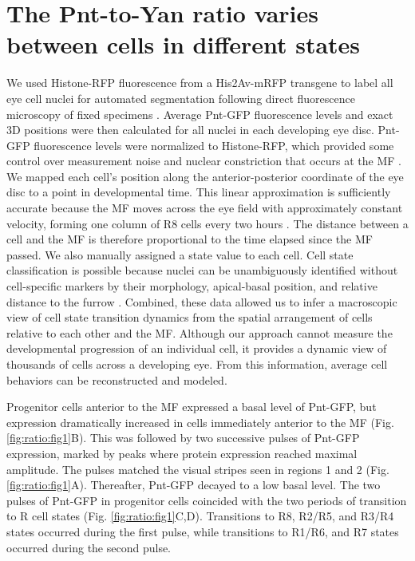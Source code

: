 \section{The Pnt-to-Yan ratio varies between cells in different states}

We used Histone-RFP fluorescence from a His2Av-mRFP transgene to label all eye cell nuclei for automated segmentation following direct fluorescence microscopy of fixed specimens \cite{Pelaez2015a,Pelaez2016}. Average Pnt-GFP fluorescence levels and exact 3D positions were then calculated for all nuclei in each developing eye disc. Pnt-GFP fluorescence levels were normalized to Histone-RFP, which provided some control over measurement noise and nuclear constriction that occurs at the MF \cite{Pelaez2015a,Pelaez2016}. We mapped each cell's position along the anterior-posterior coordinate of the eye disc to a point in developmental time. This linear approximation is sufficiently accurate because the MF moves across the eye field with approximately constant velocity, forming one column of R8 cells every two hours \cite{Basler1989,Campos-Ortega1977}. The distance between a cell and the MF is therefore proportional to the time elapsed since the MF passed. We also manually assigned a state value to each cell. Cell state classification is possible because nuclei can be unambiguously identified without cell-specific markers by their morphology, apical-basal position, and relative distance to the furrow \cite{Ready1976a,Tomlinson1985,Tomlinson1987a,Wolff1993,Pelaez2015a,Pelaez2016}. Combined, these data allowed us to infer a macroscopic view of cell state transition dynamics from the spatial arrangement of cells relative to each other and the MF. Although our approach cannot measure the developmental progression of an individual cell, it provides a dynamic view of thousands of cells across a developing eye. From this information, average cell behaviors can be reconstructed and modeled.

Progenitor cells anterior to the MF expressed a basal level of Pnt-GFP, but expression dramatically increased in cells immediately anterior to the MF (Fig. \ref{fig:ratio:fig1}B). This was followed by two successive pulses of Pnt-GFP expression, marked by peaks where protein expression reached maximal amplitude. The pulses matched the visual stripes seen in regions 1 and 2 (Fig. \ref{fig:ratio:fig1}A). Thereafter, Pnt-GFP decayed to a low basal level. The two pulses of Pnt-GFP in progenitor cells coincided with the two periods of transition to R cell states (Fig. \ref{fig:ratio:fig1}C,D). Transitions to R8, R2/R5, and R3/R4 states occurred during the first pulse, while transitions to R1/R6, and R7 states occurred during the second pulse.

